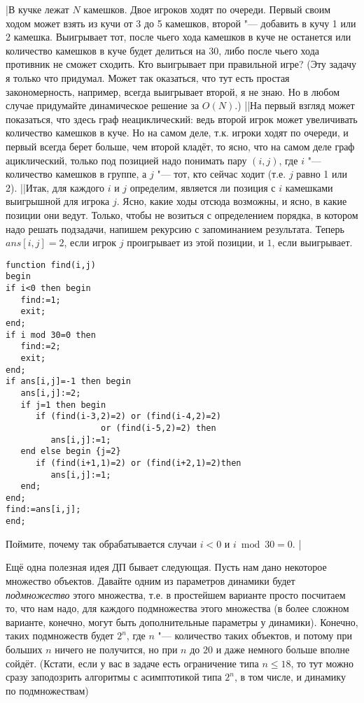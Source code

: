 \task|В кучке лежат $N$ камешков. Двое игроков ходят по очереди. Первый своим ходом может взять из кучи
от 3 до 5 камешков, второй "--- добавить в кучу 1 или 2 камешка. Выигрывает тот, после чьего хода 
камешков в куче не останется или количество камешков в куче будет делиться на 30, либо после чьего хода противник не сможет сходить. Кто выигрывает
при правильной игре? (Эту задачу я только что придумал. Может так оказаться, что тут есть простая закономерность,
например, всегда выигрывает второй, я не знаю. Но в любом случае придумайте динамическое решение за $O(N)$.)
||На первый взгляд может показаться, что здесь граф неациклический: ведь второй игрок может увеличивать количество камешков в куче. Но на самом деле, т.к. игроки ходят по очереди, и первый всегда берет больше, чем второй кладёт, то ясно, что на самом деле граф ациклический, только под позицией надо понимать пару $(i,j)$, где $i$ "--- количество камешков в группе, а $j$ "--- тот, кто сейчас ходит (т.е. $j$ равно 1 или 2).
||Итак, для каждого $i$ и $j$ определим, является ли позиция с $i$ камешками выигрышной для игрока $j$. Ясно, какие ходы отсюда возможны, и ясно, в какие позиции они ведут. Только, чтобы не возиться с определением порядка, в котором надо решать подзадачи, напишем рекурсию с запоминанием результата. Теперь $ans[i,j]=2$, если игрок $j$ проигрывает из этой позиции, и $1$, если выигрывает.
\begin{codesample}\begin{verbatim}
function find(i,j)
begin
if i<0 then begin
   find:=1;
   exit;
end;
if i mod 30=0 then
   find:=2;
   exit;
end;
if ans[i,j]=-1 then begin
   ans[i,j]:=2;
   if j=1 then begin
      if (find(i-3,2)=2) or (find(i-4,2)=2) 
                   or (find(i-5,2)=2) then
         ans[i,j]:=1;
   end else begin {j=2}
      if (find(i+1,1)=2) or (find(i+2,1)=2)then
         ans[i,j]:=1;
   end;
end;
find:=ans[i,j];
end;
\end{verbatim}
\end{codesample}
Поймите, почему так обрабатывается случаи $i<0$ и $i\bmod 30=0$.
|

 Ещё одна полезная идея ДП бывает следующая. Пусть нам дано некоторое
множество объектов. Давайте одним из параметров динамики будет \textit{подмножество} этого
множества, т.е. в простейшем варианте просто посчитаем то, что нам надо, для каждого подмножества
этого множества (в более сложном варианте, конечно, могут быть дополнительные параметры у динамики).
Конечно, таких подмножеств будет $2^n$, где $n$ "--- количество таких объектов, и потому при больших
$n$ ничего не получится, но при $n$ до $20$ и даже немного больше вполне сойдёт.
(Кстати, если у вас в задаче есть ограничение типа $n\leq 18$, то тут можно сразу 
заподозрить алгоритмы с асимптотикой типа $2^n$, в том числе, и динамику по подмножествам)

